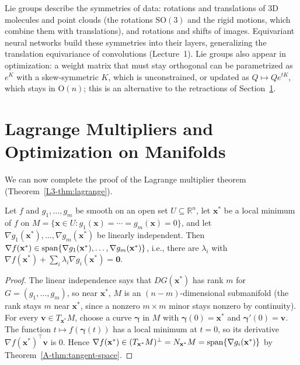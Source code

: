 \begin{remark}
    Lie groups describe the symmetries of data: rotations and translations of 3D molecules and point clouds (the rotations $\mathrm{SO}(3)$ and the rigid motions, which combine them with translations), and rotations and shifts of images. Equivariant neural networks build these symmetries into their layers, generalizing the translation equivariance of convolutions (Lecture~1). Lie groups also appear in optimization: a weight matrix that must stay orthogonal can be parametrized as $e^K$ with a skew-symmetric $K$, which is unconstrained, or updated as $Q \mapsto Qe^{tK}$, which stays in $\mathrm{O}(n)$; this is an alternative to the retractions of Section~\ref{A-sec:lagrange}.
\end{remark}

\section{Lagrange Multipliers and Optimization on Manifolds}\label{A-sec:lagrange}

We can now complete the proof of the Lagrange multiplier theorem (Theorem~\ref{L3-thm:lagrange}).

\begin{theorem}\label{A-thm:lagrange-proof}
    Let $f$ and $g_1, \ldots, g_m$ be smooth on an open set $U \subseteq \mathbb{R}^n$, let $\mathbf{x}^*$ be a local minimum of $f$ on $M = \{\mathbf{x} \in U : g_1(\mathbf{x}) = \cdots = g_m(\mathbf{x}) = 0\}$, and let $\nabla g_1(\mathbf{x}^*), \ldots, \nabla g_m(\mathbf{x}^*)$ be linearly independent. Then $\nabla f(\mathbf{x}^*) \in \operatorname{span}\{\nabla g_1(\mathbf{x}^*), \ldots, \nabla g_m(\mathbf{x}^*)\}$, i.e., there are $\lambda_i$ with $\nabla f(\mathbf{x}^*) + \sum_i \lambda_i\nabla g_i(\mathbf{x}^*) = \mathbf{0}$.
\end{theorem}

\begin{proof}
    The linear independence says that $DG(\mathbf{x}^*)$ has rank $m$ for $G = (g_1, \ldots, g_m)$, so near $\mathbf{x}^*$, $M$ is an $(n - m)$-dimensional submanifold (the rank stays $m$ near $\mathbf{x}^*$, since a nonzero $m \times m$ minor stays nonzero by continuity). For every $\mathbf{v} \in T_{\mathbf{x}^*}M$, choose a curve $\boldsymbol{\gamma}$ in $M$ with $\boldsymbol{\gamma}(0) = \mathbf{x}^*$ and $\boldsymbol{\gamma}'(0) = \mathbf{v}$. The function $t \mapsto f(\boldsymbol{\gamma}(t))$ has a local minimum at $t = 0$, so its derivative $\nabla f(\mathbf{x}^*)^\top\mathbf{v}$ is $0$. Hence $\nabla f(\mathbf{x}^*) \in (T_{\mathbf{x}^*}M)^\perp = N_{\mathbf{x}^*}M = \operatorname{span}\{\nabla g_i(\mathbf{x}^*)\}$ by Theorem~\ref{A-thm:tangent-space}.
\end{proof}

